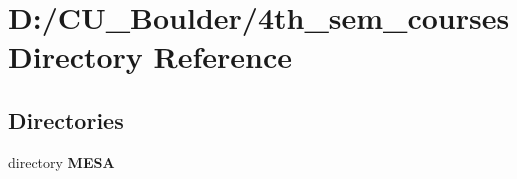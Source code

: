 \section{D\+:/\+C\+U\+\_\+\+Boulder/4th\+\_\+sem\+\_\+courses Directory Reference}
\label{dir_3cf0240c737bd5bfe2de3267a7e58647}
\subsection*{Directories}
\begin{DoxyCompactItemize}
\item 
directory \textbf{ M\+E\+SA}
\end{DoxyCompactItemize}
